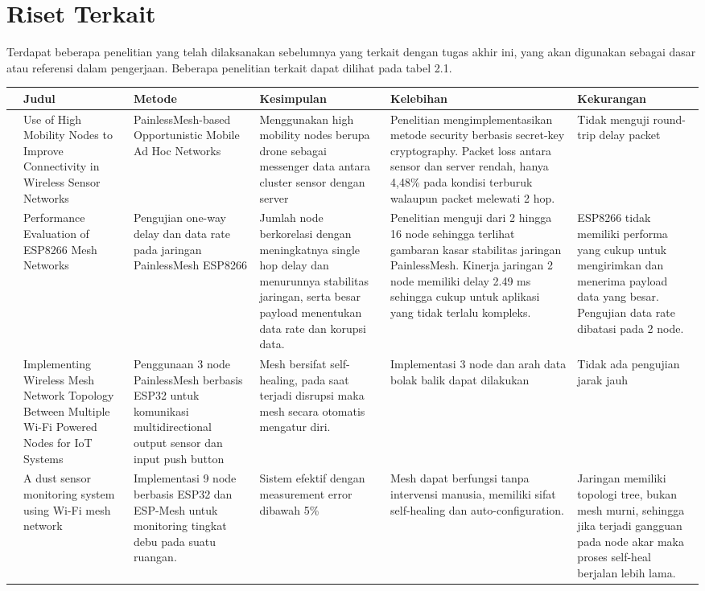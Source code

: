 \section{Riset Terkait}
Terdapat beberapa penelitian yang telah dilaksanakan sebelumnya yang terkait dengan tugas akhir ini, yang akan digunakan sebagai dasar atau referensi dalam pengerjaan. Beberapa penelitian terkait dapat dilihat pada tabel 2.1.
\pagebreak
\begin{center}
	\footnotesize
	\begin{longtable}{|p{0.5cm}|p{2cm}|p{2cm}|p{2cm}|p{2cm}|p{2cm}|}
		\hline
		&\textbf{Judul}&\textbf{Metode}&\textbf{Kesimpulan}&\textbf{Kelebihan}&\textbf{Kekurangan}\\
		\hline
		\cite{santosUseHighMobility2021}&Use of High Mobility Nodes to Improve Connectivity in Wireless Sensor Networks&PainlessMesh-based Opportunistic Mobile Ad Hoc Networks&Menggunakan high mobility nodes berupa drone sebagai messenger data antara cluster sensor dengan server&Penelitian mengimplementasikan metode security berbasis secret-key cryptography. Packet loss antara sensor dan server rendah, hanya 4,48\% pada kondisi terburuk walaupun packet melewati 2 hop.
		&Tidak menguji round-trip delay packet\\
		\hline
		\cite{chiaPerformanceEvaluationESP82662019a}&Performance Evaluation of ESP8266 Mesh Networks&Pengujian one-way delay dan data rate pada jaringan PainlessMesh ESP8266& Jumlah node berkorelasi dengan meningkatnya single hop delay dan menurunnya stabilitas jaringan, serta besar payload menentukan data rate dan korupsi data.&Penelitian menguji dari 2 hingga 16 node sehingga terlihat gambaran kasar stabilitas jaringan PainlessMesh. Kinerja jaringan 2 node memiliki delay 2.49 ms sehingga cukup untuk aplikasi yang tidak terlalu kompleks.&ESP8266 tidak memiliki performa yang cukup untuk mengirimkan dan menerima payload data yang besar. Pengujian data rate dibatasi pada 2 node. \\
		\hline
		\cite{manviImplementingWirelessMesh2020}&Implementing Wireless Mesh Network Topology Between Multiple Wi-Fi Powered Nodes for IoT Systems&Penggunaan 3 node PainlessMesh berbasis ESP32 untuk komunikasi multidirectional output sensor dan input push button&Mesh bersifat self-healing, pada saat terjadi disrupsi maka mesh secara otomatis mengatur diri.&Implementasi 3 node dan arah data bolak balik dapat dilakukan&Tidak ada pengujian jarak jauh\\
		\hline
		\cite{guoDustSensorMonitoring2021}&A dust sensor monitoring system using Wi-Fi mesh network&Implementasi 9 node berbasis ESP32 dan ESP-Mesh untuk monitoring tingkat debu pada suatu ruangan.&Sistem efektif dengan measurement error dibawah 5\%&Mesh dapat berfungsi tanpa intervensi manusia, memiliki sifat self-healing dan auto-configuration.& Jaringan memiliki topologi tree, bukan mesh murni, sehingga jika terjadi gangguan pada node akar maka proses self-heal berjalan lebih lama.\\
		\hline
	\end{longtable}
\end{center}
